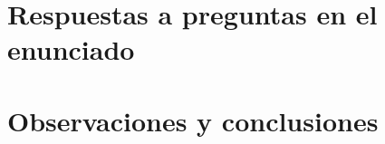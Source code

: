\section{Respuestas a preguntas en el enunciado}
\resetallcounters

\clearpage


\section{Observaciones y conclusiones}
\resetallcounters

\cleardoublepage


